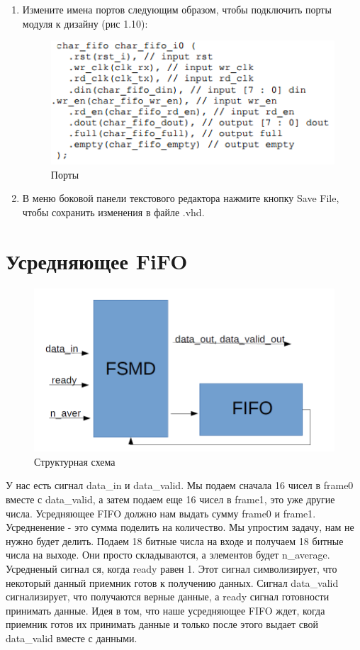 \begin{enumerate}
\item Измените имена портов следующим образом, чтобы подключить порты модуля к дизайну (рис 1.10):

\begin{figure}[h]
\centering
\includegraphics[width=1.1\textwidth]{fifo_ip_10}
\caption{Порты}
\label{fifo_ip_10_label}
\end{figure}

\item В меню боковой панели текстового редактора нажмите кнопку Save File, чтобы сохранить изменения в файле .vhd.
\end{enumerate}

\section{Усредняющее FiFO}
\begin{figure}[h]
\centering
\includegraphics[width=1.1\textwidth]{structure}
\caption{Структурная схема}
\label{struct}
\end{figure}

У нас есть сигнал data\_in и data\_valid. Мы подаем сначала 16 чисел в frame0 вместе с data\_valid, а затем подаем еще 16 чисел в frame1, это уже другие числа. Усредняющее FIFO должно нам выдать сумму frame0 и frame1. Усредненение - это сумма поделить на количество. Мы упростим задачу, нам не нужно будет делить. Подаем 18 битные числа на входе и получаем 18 битные числа на выходе. Они просто складываются, а элементов будет n\_average. Усредненый сигнал 
ся, когда ready равен 1. Этот сигнал символизирует, что некоторый данный приемник готов к получению данных. Сигнал data\_valid сигнализирует, что получаются верные данные, а ready сигнал готовности принимать данные.
Идея в том, что наше усредняющее FIFO ждет, когда приемник готов их принимать данные и только после этого выдает свой data\_valid вместе с данными.

